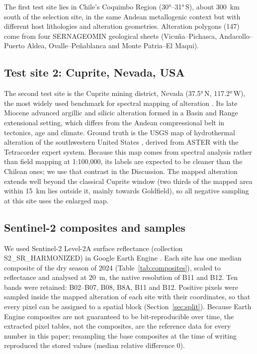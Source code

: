 \documentclass[preprint,authoryear,number]{elsarticle}
\begin{document}
The first test site lies in Chile's Coquimbo Region (\ang{30}--\ang{31}\,S), about \SI{300}{\kilo\meter} south of the selection site, in the same Andean metallogenic context but with different host lithologies and alteration geometries. Alteration polygons (147) come from four SERNAGEOMIN geological sheets (Vicu\~na--Pichasca, Andacollo--Puerto Aldea, Ovalle--Pe\~nablanca and Monte Patria--El Maqui).

\subsection{Test site 2: Cuprite, Nevada, USA}

The second test site is the Cuprite mining district, Nevada (\ang{37.5}\,N, \ang{117.2}\,W), the most widely used benchmark for spectral mapping of alteration \citep{Swayze2014}. Its late Miocene advanced argillic and silicic alteration formed in a Basin and Range extensional setting, which differs from the Andean compressional belt in tectonics, age and climate. Ground truth is the USGS map of hydrothermal alteration of the southwestern United States \citep{Rockwell2017}, derived from ASTER with the Tetracorder expert system. Because this map comes from spectral analysis rather than field mapping at 1:100{,}000, its labels are expected to be cleaner than the Chilean ones; we use that contrast in the Discussion. The mapped alteration extends well beyond the classical Cuprite window (two thirds of the mapped area within \SI{15}{\kilo\meter} lies outside it, mainly towards Goldfield), so all negative sampling at this site uses the enlarged map.

\subsection{Sentinel-2 composites and samples}

We used Sentinel-2 Level-2A surface reflectance (collection S2\_SR\_HARMONIZED) in Google Earth Engine \citep{Gorelick2017}. Each site has one median composite of the dry season of 2024 (Table~\ref{tab:composites}), scaled to reflectance and analysed at \SI{20}{\meter}, the native resolution of B11 and B12. Ten bands were retained: B02--B07, B08, B8A, B11 and B12. Positive pixels were sampled inside the mapped alteration of each site with their coordinates, so that every pixel can be assigned to a spatial block (Section~\ref{sec:split}). Because Earth Engine composites are not guaranteed to be bit-reproducible over time, the extracted pixel tables, not the composites, are the reference data for every number in this paper; resampling the base composites at the time of writing reproduced the stored values (median relative difference 0).
\end{document}
